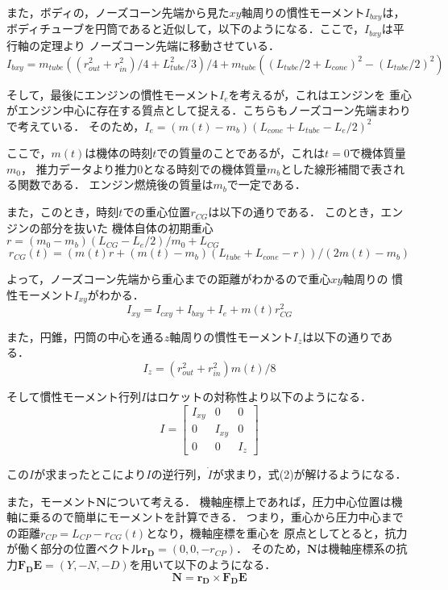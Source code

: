 \documentclass[a4paper]{jsarticle}
\begin{document}
また，ボディの，ノーズコーン先端から見た$xy$軸周りの慣性モーメント$I_{bxy}$は，
ボディチューブを円筒であると近似して，以下のようになる．ここで，$I_{bxy}$は平行軸の定理より
ノーズコーン先端に移動させている．
\begin{equation}
  I_{bxy} = m_{tube}((r_{out}^2 + r_{in}^2)/ 4 + L_{tube}^2/ 3) / 4
  + m_{tube}((L_{tube} / 2 + L_{cone})^2 - (L_{tube} / 2)^2)
\end{equation}

そして，最後にエンジンの慣性モーメント$I_e$を考えるが，これはエンジンを
重心がエンジン中心に存在する質点として捉える．こちらもノーズコーン先端まわり
で考えている．
そのため，$I_e = (m(t) - m_b)(L_{cone} + L_{tube} - L_e / 2)^2$

ここで，$m(t)$は機体の時刻$t$での質量のことであるが，これは$t=0$で機体質量$m_0$，
推力データより推力0となる時刻での機体質量$m_b$とした線形補間で表される関数である．
エンジン燃焼後の質量は$m_b$で一定である．

また，このとき，時刻$t$での重心位置$r_{CG}$は以下の通りである．
このとき，エンジンの部分を抜いた
機体自体の初期重心$r= (m_0 - m_b)(L_{CG} - L_e / 2) / m_0 + L_{CG}$
\begin{equation}
  r_{CG}(t)=(m(t)r+ (m(t) - m_b)(L_{tube} + L_{cone} - r)) / (2m(t) - m_b)
\end{equation}

よって，ノーズコーン先端から重心までの距離がわかるので重心$xy$軸周りの
慣性モーメント$I_{xy}$がわかる．
\begin{equation}
  I_{xy} = I_{cxy} + I_{bxy} + I_e + m(t)r_{CG}^2
\end{equation}

また，円錐，円筒の中心を通る$z$軸周りの慣性モーメント$I_z$は以下の通りである．
\begin{equation}
  I_z = (r_{out}^2 + r_{in}^2)m(t) / 8
\end{equation}

そして慣性モーメント行列$I$はロケットの対称性より以下のようになる．
\begin{equation}
  I =
  \begin{bmatrix}
    I_{xy} & 0 & 0 \\
    0 & I_{xy} & 0 \\
    0 & 0 & I_{z}
  \end{bmatrix}
\end{equation}

この$I$が求まったとこにより$I$の逆行列，$\dot{I}$が求まり，式(2)が解けるようになる．

また，モーメント$\bm{N}$について考える．
機軸座標上であれば，圧力中心位置は機軸に乗るので簡単にモーメントを計算できる．
つまり，重心から圧力中心までの距離$r_{CP} = L_{CP} - r_{CG}(t)$となり，機軸座標を重心を
原点としてとると，抗力が働く部分の位置ベクトル$\bm{r_D} = (0, 0, -r_{CP})$．
そのため，$\bm{N}$は機軸座標系の抗力$\bm{F_DE} = (Y, -N, -D)$を用いて以下のようになる．
\begin{equation}
  \bm{N} = \bm{r_D} \times \bm{F_DE}
\end{equation}
\end{document}
